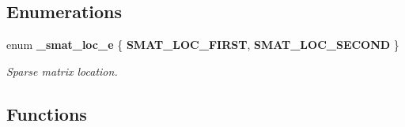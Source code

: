\subsection*{Enumerations}
\begin{CompactItemize}
\item 
enum {\bf \_\-smat\_\-loc\_\-e} \{ {\bf SMAT\_\-LOC\_\-FIRST}, 
{\bf SMAT\_\-LOC\_\-SECOND}
 \}
\begin{CompactList}\small\item\em Sparse matrix location.\item\end{CompactList}\end{CompactItemize}
\subsection*{Functions}
